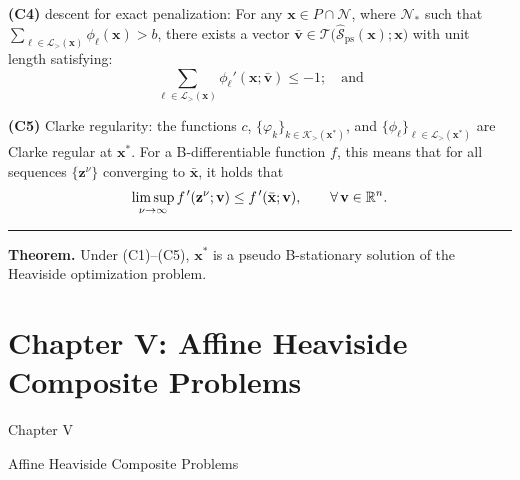 \documentclass[aspectratio=169,xcolor=dvipsnames]{beamer}
\newcommand{\fp}{f\mkern2mu'}
\begin{document}
\begin{frame}
  \footnotesize
  \setlength{\abovedisplayskip}{4pt}
  \setlength{\belowdisplayskip}{4pt}

  \textbf{(C4)} \textcolor{MediumRed}{descent for exact penalization}: For any
  $\mathbf{x}\in P\cap\mathcal{N}$, where $\mathcal{N}_*$ such that
  $\sum_{\ell\in\mathcal{L}_>(\mathbf{x})}\phi_\ell(\mathbf{x})>b$, there
  exists a vector
  $\bar{\mathbf{v}}\in\mathcal{T}\bigl(\widehat{\mathcal{S}}_{\mathrm{ps}}
  (\mathbf{x});\mathbf{x}\bigr)$ with unit length satisfying:
  \[
    \sum_{\ell\in\mathcal{L}_>(\mathbf{x})}
      \phi_\ell'(\mathbf{x};\bar{\mathbf{v}})\leq -1;\quad\text{and}
  \]

  \textbf{(C5)} \textcolor{MediumRed}{Clarke regularity}: the functions $c$,
  $\{\varphi_k\}_{k\in\mathcal{K}_>(\mathbf{x}^*)}$, and
  $\{\phi_\ell\}_{\ell\in\mathcal{L}_>(\mathbf{x}^*)}$ are Clarke regular
  at $\mathbf{x}^*$. For a B-differentiable function $f$, this means that for
  all sequences $\{\mathbf{z}^\nu\}$ converging to $\bar{\mathbf{x}}$, it
  holds that
  \[
    \limsup_{\nu\to\infty}\fp(\mathbf{z}^\nu;\mathbf{v})
    \leq\fp(\bar{\mathbf{x}};\mathbf{v}),\qquad
    \forall\,\mathbf{v}\in\mathbb{R}^n.
  \]

  \vspace{0.04cm}
  {\color{MediumBlack}\rule{\linewidth}{0.4pt}}
  \vspace{0.06cm}

  \textbf{Theorem.} Under (C1)--(C5), $\mathbf{x}^*$ is a pseudo B-stationary
  solution of the Heaviside optimization problem.
\end{frame}

\section{Chapter V: Affine Heaviside Composite Problems}

\begin{frame}[plain]
  \hypertarget{chapter-affine}{}
  \centering
  \vfill
  {Chapter V\par}
  \vspace{0.34cm}
  {\mdseries\large
    Affine Heaviside Composite Problems\par}
  \vfill
\end{frame}
\end{document}
